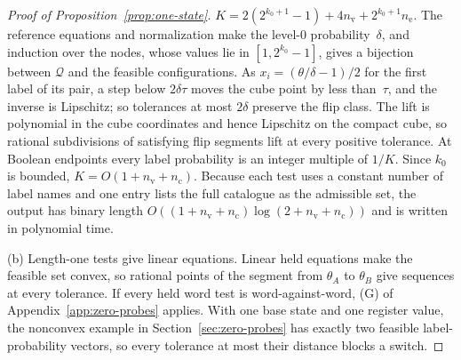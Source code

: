 \begin{proof}[Proof of Proposition~\ref{prop:one-state}]
$K=2(2^{k_0+1}-1)+4n_{\mathrm v}+2^{k_0+1}n_{\mathrm e}$. The reference
equations and normalization make the level-$0$ probability~$\delta$, and
induction over the nodes, whose values lie in $[1,2^{k_0}-1]$, gives a
bijection between $\mathcal Q$ and the feasible configurations. As
$x_i=(\theta/\delta-1)/2$ for the first label of its pair, a step below
$2\delta\tau$ moves the cube point by less than~$\tau$, and the inverse is
Lipschitz; so tolerances at most $2\delta$ preserve the flip class. %
The lift is polynomial in the cube coordinates and hence Lipschitz on the
compact cube, so rational subdivisions of satisfying flip segments lift at
every positive tolerance. At Boolean endpoints every label probability is
an integer multiple of $1/K$. Since $k_0$ is bounded,
$K=O(1+n_{\mathrm v}+n_{\mathrm c})$. Because each test uses a constant
number of label names and one entry lists the full catalogue as the
admissible set, the output has binary length
$O((1+n_{\mathrm v}+n_{\mathrm c})\log(2+n_{\mathrm v}+n_{\mathrm c}))$
and is written in polynomial time.

(b) Length-one tests give linear equations. Linear held equations make the
feasible set convex, so rational points of the segment from $\theta_A$ to
$\theta_B$ give sequences at every tolerance. If every held word test
is word-against-word, (G) of Appendix~\ref{app:zero-probes} applies. With
one base state and one register value, the nonconvex example in
Section~\ref{sec:zero-probes} has exactly two feasible label-probability
vectors, so every tolerance at most their distance blocks a switch.


\end{proof}
